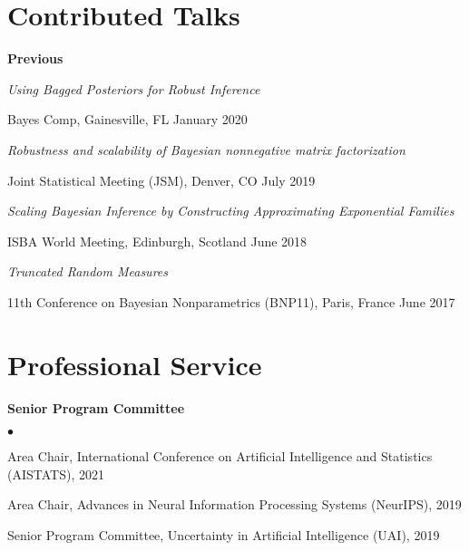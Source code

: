 \documentclass[margin,line]{res}
\newenvironment{list2}{
  \begin{list}{$\bullet$}{%
      \setlength{\itemsep}{0in}
      \setlength{\parsep}{0in} \setlength{\parskip}{0in}
      \setlength{\topsep}{0in} \setlength{\partopsep}{0in}
      \setlength{\leftmargin}{0.2in}}}{\end{list}}
\newenvironment{talkgroup}{\setlength{\parskip}{3pt}\everypar{\hangafter=1\hangindent=1em\relax}\par}{\par\everypar{\hangafter=0\relax}}
\begin{document}
\begin{resume}
\begin{talkgroup}
\end{talkgroup}



\section{\sc Contributed Talks}

%
%
%



\textbf{Previous}

\emph{Using Bagged Posteriors for Robust Inference}
\begin{talkgroup}
Bayes Comp, Gainesville, FL \hfill January 2020
\end{talkgroup}

\emph{Robustness and scalability of Bayesian nonnegative matrix factorization}
\begin{talkgroup}
Joint Statistical Meeting (JSM), Denver, CO \hfill July 2019
\end{talkgroup}

\emph{Scaling Bayesian Inference by Constructing Approximating Exponential Families}
\begin{talkgroup}
ISBA World Meeting, Edinburgh, Scotland \hfill June 2018
\end{talkgroup}

\emph{Truncated Random Measures}
\begin{talkgroup}
11th Conference on Bayesian Nonparametrics (BNP11), Paris, France \hfill June 2017
\end{talkgroup}

\section{\sc Professional Service}
\textbf{Senior Program Committee}
\begin{list2}
\item {Area Chair}, International Conference on Artificial Intelligence and Statistics (AISTATS), 2021
\item {Area Chair}, Advances in Neural Information Processing Systems (NeurIPS), 2019
\item {Senior Program Committee}, Uncertainty in Artificial Intelligence (UAI), 2019
\end{list2}


\end{resume}
\end{document}
